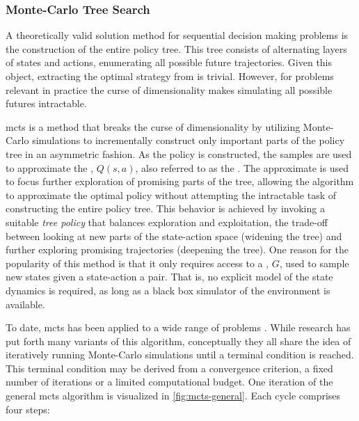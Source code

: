 \subsubsection{Monte-Carlo Tree Search}
A theoretically valid solution method for sequential decision making problems
is the construction of the entire policy tree. This tree consists of alternating
layers of states and actions, enumerating all possible future trajectories.
Given this object, extracting the optimal strategy from is trivial. However,
for problems relevant in practice the curse of dimensionality makes simulating
all possible futures intractable.

\acf{mcts} is a method that breaks the curse of dimensionality by utilizing
Monte-Carlo simulations to incrementally construct only important parts of the
policy tree in an asymmetric fashion. As the policy is constructed, the samples
are used to approximate the , $Q(s, a)$,
also referred to as the \vname{\qfunction}. The approximate \qfunction is used
to focus further exploration of promising parts of the tree, allowing the
algorithm to approximate the optimal policy without attempting the intractable
task of constructing the entire policy tree. This behavior is achieved by
invoking a suitable \emph{tree policy} that balances exploration and
exploitation, the trade-off between looking at new parts of the state-action
space (widening the tree) and further exploring promising trajectories
(deepening the tree). One reason for the popularity of this method is that
it only requires access to a , $G$, used to sample new states
given a state-action a pair. That is, no explicit model of the state dynamics is
required, as long as a black box simulator of the environment is available.

To date, \ac{mcts} has been applied to a wide range of problems
\cite{browne2012survey}. While research has put forth many variants of this
algorithm, conceptually they all share the idea of iteratively running
Monte-Carlo simulations until a terminal condition is reached. This terminal
condition may be derived from a convergence criterion, a fixed number of
iterations or a limited computational budget. One iteration of the general
\ac{mcts} algorithm is visualized in \cref{fig:mcts-general}. Each cycle
comprises four steps:

